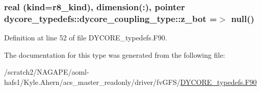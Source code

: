 \subsubsection[{z\-\_\-bot}]{\setlength{\rightskip}{0pt plus 5cm}real (kind=r8\-\_\-kind), dimension(\-:), pointer dycore\-\_\-typedefs\-::dycore\-\_\-coupling\-\_\-type\-::z\-\_\-bot =$>$ null()}\label{structdycore__typedefs_1_1dycore__coupling__type_a92cc02abdb31595b5e42e1e76ebc4943}


Definition at line 52 of file D\-Y\-C\-O\-R\-E\-\_\-typedefs.\-F90.



The documentation for this type was generated from the following file\-:\begin{DoxyCompactItemize}
\item 
/scratch2/\-N\-A\-G\-A\-P\-E/aoml-\/hafs1/\-Kyle.\-Ahern/acs\-\_\-master\-\_\-readonly/driver/fv\-G\-F\-S/\hyperlink{DYCORE__typedefs_8F90}{D\-Y\-C\-O\-R\-E\-\_\-typedefs.\-F90}\end{DoxyCompactItemize}
